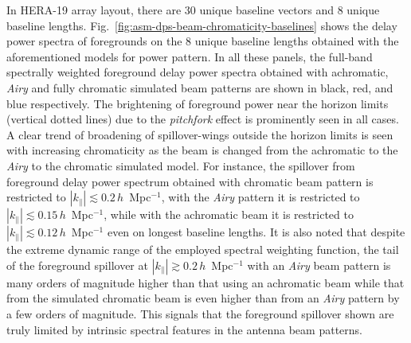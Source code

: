 \documentclass[preprint2,iop,numberedappendix,twocolappendix,appendixfloats]{emulateapj}
\begin{document}
\begin{figure}[htb]
  \label{fig:window-functions}
\end{figure}

In HERA-19 array layout, there are 30 unique baseline vectors and 8 unique baseline lengths. Fig.~\ref{fig:asm-dps-beam-chromaticity-baselines} shows the delay power spectra of foregrounds on the 8 unique baseline lengths obtained with the aforementioned models for power pattern. In all these panels, the full-band spectrally weighted foreground delay power spectra obtained with achromatic, {\it Airy} and fully chromatic simulated beam patterns are shown in black, red, and blue respectively. The brightening of foreground power near the horizon limits (vertical dotted lines) due to the {\it pitchfork} effect \citep{thy15a,thy15b} is prominently seen in all cases. A clear trend of broadening of spillover-wings outside the horizon limits is seen with increasing chromaticity as the beam is changed from the achromatic to the {\it Airy} to the chromatic simulated model. For instance, the spillover from foreground delay power spectrum obtained with chromatic beam pattern is restricted to $|k_\parallel| \lesssim 0.2\,h$~Mpc$^{-1}$, with the {\it Airy} pattern it is restricted to $|k_\parallel| \lesssim 0.15\,h$~Mpc$^{-1}$, while with the achromatic beam it is restricted to $|k_\parallel| \lesssim 0.12\,h$~Mpc$^{-1}$ even on longest baseline lengths. It is also noted that despite the extreme dynamic range of the employed spectral weighting function, the tail of the foreground spillover at $|k_\parallel| \gtrsim 0.2\,h$~Mpc$^{-1}$ with an {\it Airy} beam pattern is many orders of magnitude higher than that using an achromatic beam while that from the simulated chromatic beam is even higher than from an {\it Airy} pattern by a few orders of magnitude. This signals that the foreground spillover shown are truly limited by intrinsic spectral features in the antenna beam patterns. 
\end{document}
